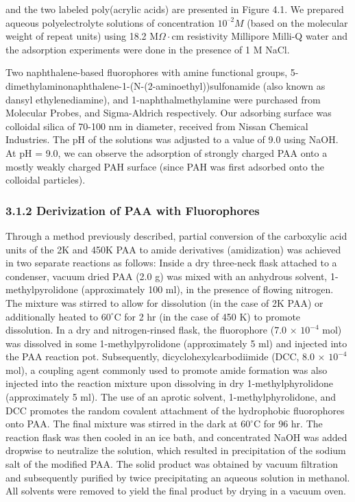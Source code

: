 \documentclass[journal=mamobx,manuscript=article]{achemso}
\begin{document}
and the two labeled poly(acrylic acids) are presented in Figure 4.1.  We prepared aqueous polyelectrolyte solutions of concentration $10^{–2} M$ (based on the molecular weight of repeat units) using 18.2 M$\Omega\cdot$cm resistivity Millipore Milli-Q water and the adsorption experiments were done in the presence of 1 M NaCl.  

Two naphthalene-based fluorophores with amine functional groups, 5-dimethylaminonaphthalene-1-(N-(2-aminoethyl))sulfonamide (also known as dansyl ethylenediamine), and 1-naphthalmethylamine were purchased from Molecular Probes, and Sigma-Aldrich respectively.  Our adsorbing surface was colloidal silica of 70-100 nm in diameter, received from Nissan Chemical Industries. The pH of the solutions was adjusted to a value of 9.0 using NaOH.  At pH = 9.0, we can observe the adsorption of strongly charged PAA onto a mostly weakly charged PAH surface (since PAH was first adsorbed onto the colloidal particles).

\subsubsection{3.1.2 Derivization of PAA with Fluorophores}

Through a method previously described, \cite{weber1954fluorescent,Anghel1998} partial conversion of the carboxylic acid units of the 2K and 450K PAA to amide derivatives (amidization) was achieved in two separate reactions as follows:  Inside a dry three-neck flask attached to a condenser, vacuum dried PAA (2.0 g) was mixed with an anhydrous solvent, 1-methylpyrolidone (approximately 100 ml), in the presence of flowing nitrogen.  The mixture was stirred to allow for dissolution (in the case of 2K PAA) or additionally heated to $60^{\circ}$C for 2 hr (in the case of 450 K) to promote dissolution.  In a dry and nitrogen-rinsed flask, the fluorophore (7.0 $\times$ $10^{-4}$ mol) was dissolved in some 1-methylpyrolidone (approximately 5 ml) and injected into the PAA reaction pot.  Subsequently, dicyclohexylcarbodiimide (DCC, 8.0 $\times$ $10^{-4}$ mol), a coupling agent commonly used to promote amide formation was also injected into the reaction mixture upon dissolving in dry 1-methylphyrolidone (approximately 5 ml).  The use of an aprotic solvent, 1-methylphyrolidone, and DCC promotes the random covalent attachment of the hydrophobic fluorophores onto PAA.\cite{Anghel1998}  The final mixture was stirred in the dark at $60^{\circ}$C for 96 hr.  The reaction flask was then cooled in an ice bath, and concentrated NaOH was added dropwise to neutralize the solution, which resulted in precipitation of the sodium salt of the modified PAA.  The solid product was obtained by vacuum filtration and subsequently purified by twice precipitating an aqueous solution in methanol.  All solvents were removed to yield the final product by drying in a vacuum oven.
\end{document}
